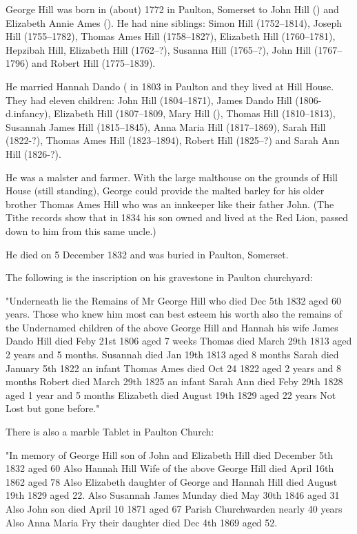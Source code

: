 
George Hill was born in (about) 1772 in	Paulton, Somerset to John Hill () and Elizabeth Annie Ames ().  He had nine siblings: Simon Hill (1752--1814), Joseph Hill (1755--1782), Thomas Ames Hill (1758--1827), Elizabeth Hill (1760--1781), Hepzibah Hill, Elizabeth Hill (1762--?), Susanna Hill (1765--?),
John Hill (1767--1796) and Robert Hill (1775--1839). 

He married Hannah Dando ( in 1803 in Paulton and they lived at Hill House. They had eleven children: 
John Hill (1804--1871), James Dando Hill (1806-d.infancy), Elizabeth Hill (1807--1809, Mary Hill (),
Thomas Hill (1810--1813), Susannah James Hill (1815--1845), Anna Maria Hill (1817--1869), Sarah Hill (1822-?),
Thomas Ames Hill (1823--1894), Robert Hill (1825--?) and Sarah Ann Hill (1826-?). 
    
He was a malster and farmer. With the large malthouse on the grounds of Hill House (still standing), George could provide the malted barley for his older brother Thomas Ames Hill who was an innkeeper like their father John. (The Tithe records show that in 1834 his son owned and lived at the Red Lion, passed down to him from this same uncle.) 

He died on 5 December 1832 and was buried in Paulton, Somerset.

The following is the inscription on his gravestone in Paulton churchyard:

"Underneath lie the Remains of Mr George Hill who died Dec 5th 1832 aged 60 years.
Those who knew him most can best esteem his worth also the remains of the Undernamed children of the above
George Hill and Hannah his wife
James Dando Hill died Feby 21st 1806 aged 7 weeks
Thomas died March 29th 1813 aged 2 years and 5 months.
Susannah died Jan 19th 1813 aged 8 months
Sarah died January 5th 1822 an infant
Thomas Ames died Oct 24 1822 aged 2 years and 8 months
Robert died March 29th 1825 an infant
Sarah Ann died Feby 29th 1828 aged 1 year and 5 months
Elizabeth died August 19th 1829 aged 22 years
Not Lost but gone before."

There is also a marble Tablet in Paulton Church:

"In memory of George Hill son of John and Elizabeth Hill died December 5th 1832 aged 60
Also Hannah Hill Wife of the above George Hill died April 16th 1862 aged 78
Also Elizabeth daughter of George and Hannah Hill died August 19th 1829 aged 22.
Also Susannah James Munday died May 30th 1846 aged 31
Also John son died April 10 1871 aged 67 Parish Churchwarden nearly 40 years
Also Anna Maria Fry their daughter died Dec 4th 1869 aged 52.


